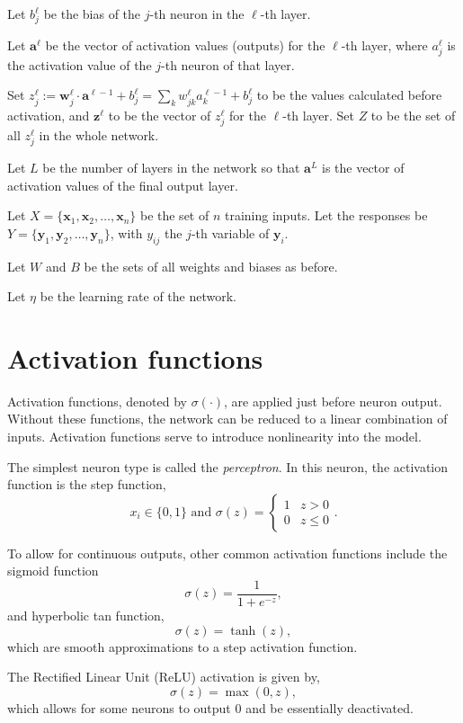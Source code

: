 Let $b_j^\ell$ be the bias of the $j$-th neuron in the $\ell$-th layer.

Let $\mathbf{a}^\ell$ be the vector of activation values (outputs) for the $\ell$-th layer, where $a_j^\ell$ is the activation value of the $j$-th neuron of that layer.

Set $z_j^\ell := \mathbf{w}_j^\ell\cdot \mathbf{a}^{\ell-1} + b_j^\ell= \sum_k w_{jk}^\ell a_k^{\ell-1} + b_j^\ell$ to be the values calculated before activation, and $\mathbf{z}^\ell$ to be the vector of $z_j^\ell$ for the $\ell$-th layer. Set $Z$ to be the set of all $z_j^\ell$ in the whole network.

Let $L$ be the number of layers in the network so that $\mathbf{a}^L$ is the vector of activation values of the final output layer.

Let $X = \{\mathbf{x}_1, \mathbf{x}_2, \ldots, \mathbf{x}_n\}$ be the set of $n$ training inputs. Let the responses be $Y = \{\mathbf{y}_1, \mathbf{y}_2, \ldots, \mathbf{y}_n\}$, with $y_{ij}$ the $j$-th variable of $\mathbf{y}_i$.

Let $W$ and $B$ be the sets of all weights and biases as before.

Let $\eta$ be the learning rate of the network. 

\section{Activation functions}\label{nnets-act}

Activation functions, denoted by $\sigma(\cdot)$, are applied just before neuron output. Without these functions, the network can be reduced to a linear combination of inputs. Activation functions serve to introduce nonlinearity into the model.

The simplest neuron type is called the \textit{perceptron}. In this neuron, the activation function is the step function,
\[
	x_i \in \{0,1\} \text{ and } \sigma(z) = \begin{cases}
		1 & z > 0 \\
		0 & z \le 0
	\end{cases}.
\]

To allow for continuous outputs, other common activation functions include the sigmoid function
\[
	\sigma(z) = \dfrac{1}{1+e^{-z}},
\]
and hyperbolic tan function,
\[
	\sigma(z) = \tanh(z),
\]
which are smooth approximations to a step activation function.

The Rectified Linear Unit (ReLU) activation is given by,
\[
	\sigma(z) = \max(0, z),
\]
which allows for some neurons to output 0 and be essentially deactivated.

